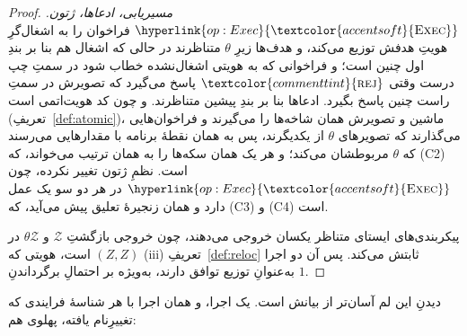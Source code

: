 \documentclass[10pt,oneside,openany]{book}
\newcommand{\Zenv}{\mathcal{Z}}
\newcommand{\op}[1]{\textnormal{\textsc{#1}}}
\newcommand{\opl}[1]{\hyperlink{op:#1}{\textcolor{accentsoft}{\op{#1}}}}
\newcommand{\atom}[1]{\textcolor{commenttint}{\op{#1}}}
\newcommand{\rej}{\atom{rej}}
\theoremstyle{accentdef}
\theoremstyle{accentplain}
\begin{document}
\begin{proof}
\emph{مسیریابی، ادعاها، ژتون.} $\opl{Exec}$ فراخوان را به اشغال‌گرِ هویتِ
هدفش توزیع می‌کند، و هدف‌ها زیرِ $\theta$ متناظرند در حالی که اشغال هم بنا
بر بندِ اول چنین است؛ و فراخوانی که به هویتی اشغال‌نشده خطاب شود در سمتِ چپ
درست وقتی $\rej$ پاسخ می‌گیرد که تصویرش در سمتِ راست چنین پاسخ بگیرد.
ادعاها بنا بر بندِ پیشین متناظرند. و چون کد هویت‌اتمی است
(تعریفِ~\ref{def:atomic})، ماشین و تصویرش همان شاخه‌ها را می‌گیرند و
فراخوان‌هایی می‌گذارند که تصویرهای $\theta$ از یکدیگرند، پس به همان نقطهٔ
برنامه با مقدارهایی می‌رسند که $\theta$ مربوطشان می‌کند؛ و هر یک همان
سکه‌ها را به همان ترتیب می‌خواند، که (C2) است. نظمِ ژتون تغییر نکرده، چون
$\opl{Exec}$ در هر دو سو یک عمل دارد و همان زنجیرهٔ تعلیق پیش می‌آید، که
(C3) و (C4) است.

پیکربندی‌های ایستای متناظر یکسان خروجی می‌دهند، چون خروجی بازگشتِ $\Zenv$ و
$\theta\Zenv$ در $(Z,Z)$ است، هویتی که (iii)ِ تعریفِ~\ref{def:reloc}
ثابتش می‌کند. پس آن دو اجرا به‌عنوانِ توزیع توافق دارند، به‌ویژه بر
احتمالِ برگرداندنِ $1$.
\end{proof}

دیدنِ این لم آسان‌تر از بیانش است. یک اجرا، و همان اجرا با هر شناسهٔ فرایندی
که تغییرِنام یافته، پهلوی هم:
\end{document}
